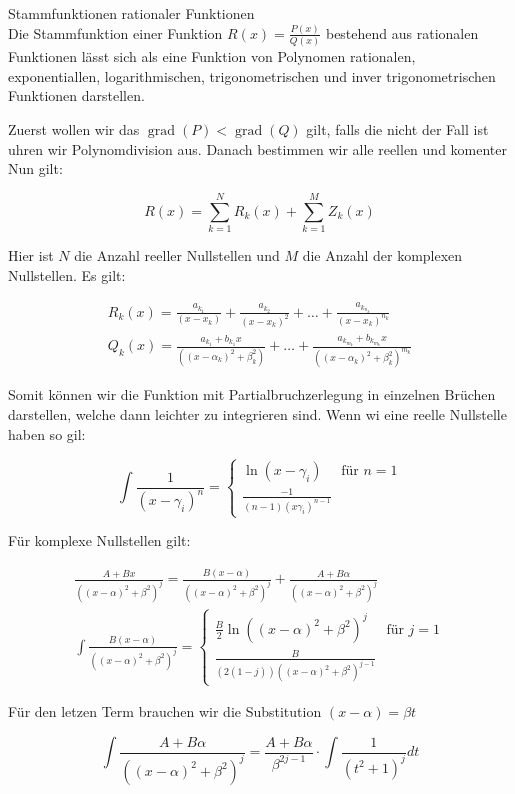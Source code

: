 \begin{KR}{Stammfunktionen rationaler Funktionen}\\
    Die Stammfunktion einer Funktion $R(x)=\frac{P(x)}{Q(x)}$ bestehend aus rationalen Funktionen lässt sich als eine Funktion von Polynomen rationalen, exponentiallen, logarithmischen, trigonometrischen und inver trigonometrischen Funktionen darstellen.

Zuerst wollen wir das $\operatorname{grad}(P)<\operatorname{grad}(Q)$ gilt, falls die nicht der Fall ist uhren wir Polynomdivision aus. Danach bestimmen wir alle reellen und komenter Nun gilt:

$$
R(x)=\sum_{k=1}^{N} R_{k}(x)+\sum_{k=1}^{M} Z_{k}(x)
$$

Hier ist $N$ die Anzahl reeller Nullstellen und $M$ die Anzahl der komplexen Nullstellen. Es gilt:

$$
\begin{gathered}
R_{k}(x)=\frac{a_{k_{1}}}{\left(x-x_{k}\right)}+\frac{a_{k_{2}}}{\left(x-x_{k}\right)^{2}}+\ldots+\frac{a_{k_{n_{k}}}}{\left(x-x_{k}\right)^{n_{k}}} \\
Q_{k}(x)=\frac{a_{k_{1}}+b_{k_{1}} x}{\left(\left(x-\alpha_{k}\right)^{2}+\beta_{k}^{2}\right)}+\ldots+\frac{a_{k_{m_{k}}}+b_{k_{m_{k}}} x}{\left(\left(x-\alpha_{k}\right)^{2}+\beta_{k}^{2}\right)^{m_{k}}}
\end{gathered}
$$

Somit können wir die Funktion mit Partialbruchzerlegung in einzelnen Brüchen darstellen, welche dann leichter zu integrieren sind. Wenn wi eine reelle Nullstelle haben so gil:

$$
\int \frac{1}{\left(x-\gamma_{i}\right)^{n}}=\left\{\begin{array}{l}
\ln \left(x-\gamma_{i}\right) \quad \text { für } n=1 \\
\frac{-1}{(n-1)\left(x \gamma_{i}\right)^{n-1}}
\end{array}\right.
$$

Für komplexe Nullstellen gilt:

$$
\begin{gathered}
\frac{A+B x}{\left((x-\alpha)^{2}+\beta^{2}\right)^{j}}=\frac{B(x-\alpha)}{\left((x-\alpha)^{2}+\beta^{2}\right)^{j}}+\frac{A+B \alpha}{\left((x-\alpha)^{2}+\beta^{2}\right)^{j}} \\
\int \frac{B(x-\alpha)}{\left((x-\alpha)^{2}+\beta^{2}\right)^{j}}=\left\{\begin{array}{l}
\frac{B}{2} \ln \left((x-\alpha)^{2}+\beta^{2}\right)^{j} \quad \text { für } j=1 \\
\frac{B}{(2(1-j))\left((x-\alpha)^{2}+\beta^{2}\right)^{j-1}}
\end{array}\right.
\end{gathered}
$$

Für den letzen Term brauchen wir die Substitution $(x-\alpha)=\beta t$

$$
\int \frac{A+B \alpha}{\left((x-\alpha)^{2}+\beta^{2}\right)^{j}}=\frac{A+B \alpha}{\beta^{2 j-1}} \cdot \int \frac{1}{\left(t^{2}+1\right)^{j}} d t
$$
\end{KR}

